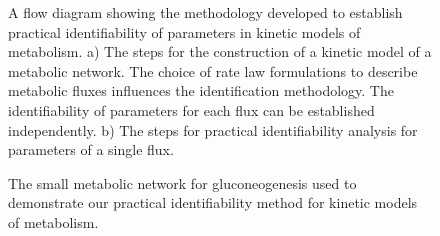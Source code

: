 \documentclass[10pt]{article}
\begin{document}
	\begin{figure}[!tbhp]
		\caption{A flow diagram showing the methodology developed to establish practical identifiability of parameters in kinetic models of metabolism. a) The steps for the construction of a kinetic model of a metabolic network. The choice of rate law formulations to describe metabolic fluxes influences the identification methodology. The identifiability of parameters for each flux can be established independently. b) The steps for practical identifiability analysis for parameters of a single flux.}\label{fig:ident-flowchart}
	\end{figure}

	\begin{figure}[!tbhp]
		\caption{The small metabolic network for gluconeogenesis used to demonstrate our practical identifiability method for kinetic models of metabolism.}\label{fig:network}
	\end{figure}		
	
\end{document}
